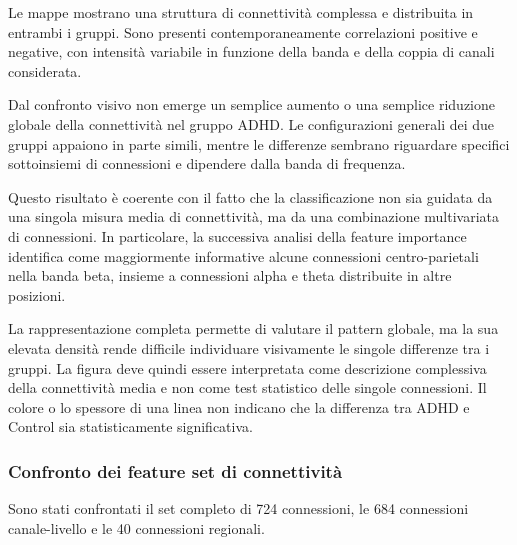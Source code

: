 Le mappe mostrano una struttura di connettività complessa e distribuita
in entrambi i gruppi. Sono presenti contemporaneamente correlazioni
positive e negative, con intensità variabile in funzione della banda
e della coppia di canali considerata.

Dal confronto visivo non emerge un semplice aumento o una semplice
riduzione globale della connettività nel gruppo ADHD. Le configurazioni
generali dei due gruppi appaiono in parte simili, mentre le differenze
sembrano riguardare specifici sottoinsiemi di connessioni e dipendere
dalla banda di frequenza.

Questo risultato è coerente con il fatto che la classificazione non
sia guidata da una singola misura media di connettività, ma da una
combinazione multivariata di connessioni. In particolare, la successiva
analisi della feature importance identifica come maggiormente
informative alcune connessioni centro-parietali nella banda beta,
insieme a connessioni alpha e theta distribuite in altre posizioni.

La rappresentazione completa permette di valutare il pattern globale,
ma la sua elevata densità rende difficile individuare visivamente le
singole differenze tra i gruppi. La figura deve quindi essere
interpretata come descrizione complessiva della connettività media e
non come test statistico delle singole connessioni. Il colore o lo
spessore di una linea non indicano che la differenza tra ADHD e
Control sia statisticamente significativa.

\subsubsection{Confronto dei feature set di connettività}

Sono stati confrontati il set completo di 724 connessioni, le
684 connessioni canale-livello e le 40 connessioni regionali.

\begin{table}[H]
	\centering
	\small
	\caption{Prestazioni medie in cross-validation della Random Forest
		sui feature set di functional connectivity.}
	\label{tab:rf_connectivity_cv_updated}
\end{table}

